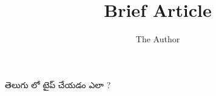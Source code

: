 \documentclass[11pt]{article}
\title{Brief Article}
\author{The Author}
\begin{document}
తెలుగు లో టైప్ చేయడం ఎలా ?
\end{document}

